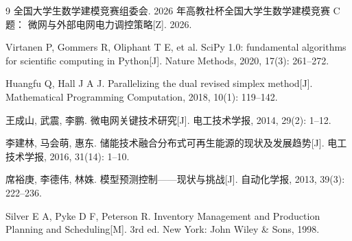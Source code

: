 \documentclass[withoutpreface,bwprint]{cumcmthesis}
\begin{document}
\label{tmp:bib}
\begin{thebibliography}{9}
  \footnotesize
  \setlength{\itemsep}{0pt}
  \setlength{\parsep}{0pt}
  全国大学生数学建模竞赛组委会. 2026 年高教社杯全国大学生数学建模竞赛 C 题：
  微网与外部电网电力调控策略[Z]. 2026.

  Virtanen P, Gommers R, Oliphant T E, et al. SciPy 1.0: fundamental algorithms
  for scientific computing in Python[J]. Nature Methods, 2020, 17(3): 261--272.

  Huangfu Q, Hall J A J. Parallelizing the dual revised simplex method[J].
  Mathematical Programming Computation, 2018, 10(1): 119--142.

  王成山, 武震, 李鹏. 微电网关键技术研究[J]. 电工技术学报, 2014, 29(2): 1--12.

  李建林, 马会萌, 惠东. 储能技术融合分布式可再生能源的现状及发展趋势[J].
  电工技术学报, 2016, 31(14): 1--10.

  席裕庚, 李德伟, 林姝. 模型预测控制——现状与挑战[J]. 自动化学报, 2013,
  39(3): 222--236.

  Silver E A, Pyke D F, Peterson R. Inventory Management and Production
  Planning and Scheduling[M]. 3rd ed. New York: John Wiley \& Sons, 1998.
\end{thebibliography}
\end{document}
